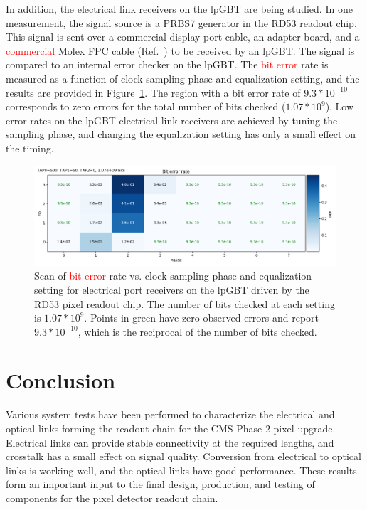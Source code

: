 \documentclass[a4paper,11pt]{article}
\newcommand{\fig}{Figure}
\newcommand{\red}{\textcolor{red}}
\begin{document}

In addition, the electrical link receivers on the lpGBT are being studied.
In one measurement, the signal source is a PRBS7 generator in the RD53 readout chip.
This signal is sent over a commercial display port cable, an adapter board, and a \red{commercial} Molex FPC cable (Ref.~\cite{ref:molex_cable}) to be received by an lpGBT.
The signal is compared to an internal error checker on the lpGBT.
The \red{bit error} rate is measured as a function of clock sampling phase and equalization setting, and the results are provided in \fig~\ref{fig:lpgbt_bert}.
The region with a bit error rate of $9.3 * 10^{-10}$ corresponds to zero errors for the total number of bits checked ($1.07 * 10^{9}$).
Low error rates on the lpGBT electrical link receivers are achieved by tuning the sampling phase, and changing the equalization setting has only a small effect on the timing.


\begin{figure}[htbp]
\centering
\includegraphics[width=1.0\textwidth,origin=c]{../figures/lpGBT_bert.png}
\caption{
\label{fig:lpgbt_bert}
Scan of \red{bit error} rate vs. clock sampling phase and equalization setting for electrical port receivers on the lpGBT driven by the RD53 pixel readout chip.
The number of bits checked at each setting is $1.07 * 10^{9}$.
Points in green have zero observed errors and report $9.3 * 10^{-10}$, which is the reciprocal of the number of bits checked.
}
\end{figure}

\section{Conclusion}
\label{sec:conclusion}

Various system tests have been performed to characterize the electrical and optical links forming the readout chain for the CMS Phase-2 pixel upgrade.
Electrical links can provide stable connectivity at the required lengths, and crosstalk has a small effect on signal quality.
Conversion from electrical to optical links is working well, and the optical links have good performance.
These results form an important input to the final design, production, and testing of components for the pixel detector readout chain.
\end{document}
